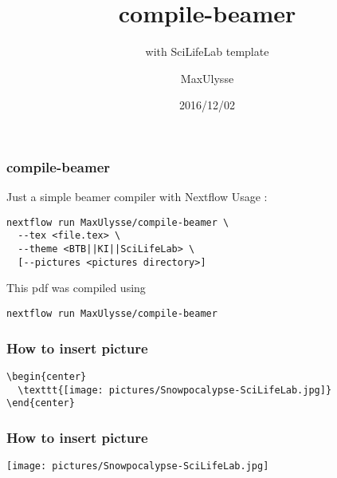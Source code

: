 \documentclass{beamer}
\title{compile-beamer}
\subtitle{with SciLifeLab template}
\author{MaxUlysse}
\institute{Barntumörbanken / SciLifeLab}
\date{2016/12/02}
\begin{document}
\begin{frame}
	\titlepage
\end{frame}

\begin{frame}[fragile]
  \frametitle{compile-beamer}
  Just a simple beamer compiler with Nextflow
  Usage :
  \begin{verbatim}
nextflow run MaxUlysse/compile-beamer \
  --tex <file.tex> \
  --theme <BTB||KI||SciLifeLab> \
  [--pictures <pictures directory>]
  \end{verbatim}
  This pdf was compiled using
  \begin{verbatim}
nextflow run MaxUlysse/compile-beamer
  \end{verbatim}
\end{frame}

\begin{frame}[fragile]
  \frametitle{How to insert picture}
  \begin{verbatim}
\begin{center}
  \texttt{[image: pictures/Snowpocalypse-SciLifeLab.jpg]}
\end{center}
  \end{verbatim}
\end{frame}

\begin{frame}
  \frametitle{How to insert picture}
  \begin{center}
    \texttt{[image: pictures/Snowpocalypse-SciLifeLab.jpg]}
  \end{center}
\end{frame}
\end{document}
